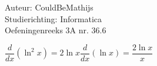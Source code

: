 \documentclass[a4paper]{article}
\begin{document}
  
\noindent \large Auteur: CouldBeMathijs \\
\noindent \large Studierichting: Informatica\\
\noindent \large Oefeningenreeks 3A nr. 36.6\\

\medskip

\normalsize

$\dfrac{d}{dx}\left(\ln^2x\right) = 2 \ln x \dfrac{d}{dx} (\ln x) = \dfrac{2\ln x}{x}$


\begin{thebibliography}{999}
\end{thebibliography}
\end{document}
